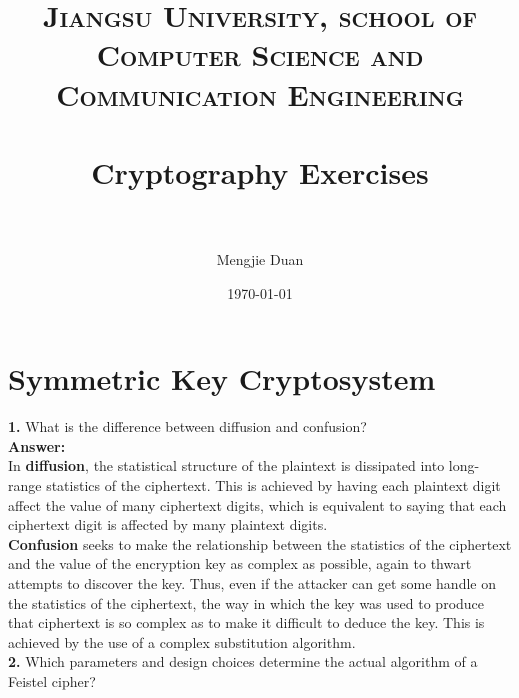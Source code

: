 \documentclass[paper=a4, fontsize=11pt]{scrartcl} %
\title{
\normalfont \normalsize
\textsc{Jiangsu University, school of Computer Science and Communication Engineering} \\ [25pt] %
\horrule{0.5pt} \\[0.4cm] %
\huge Cryptography Exercises \\ %
\horrule{2pt} \\[0.5cm] %
}
\author{Mengjie Duan} %
\date{\normalsize\today} %
\numberwithin{equation}{section} %
\numberwithin{figure}{section} %
\numberwithin{table}{section} %
\begin{document}
\maketitle %

\section{Symmetric Key Cryptosystem}
\label{sec:km}

\textbf{1.} What is the difference between diffusion and confusion?
\\

\textbf{Answer:}
\\

In \textbf{diffusion}, the statistical structure of the plaintext is dissipated into long-range statistics of the ciphertext. This is achieved by having each plaintext digit affect the value of many ciphertext digits, which is equivalent to saying that each ciphertext digit is affected by many plaintext digits. \\
\textbf{Confusion} seeks to make the relationship between the statistics of the ciphertext and the value of the encryption key as complex as possible, again to thwart attempts to discover the key. Thus, even if the attacker can get some handle on the statistics of the ciphertext, the way in which the key was used to produce that ciphertext is so complex as to make it difficult to deduce the key. This is achieved by the use of a complex substitution algorithm.
\\

\textbf{2.} Which parameters and design choices determine the actual algorithm of a Feistel cipher?
\\
\end{document}
